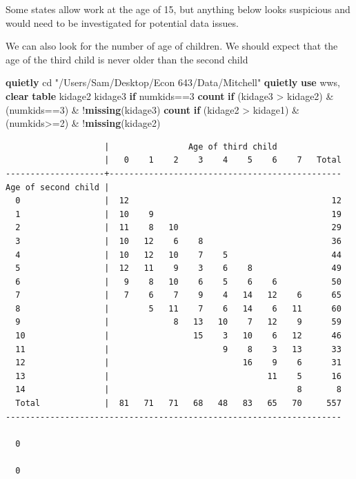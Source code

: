 \documentclass[
]{book}
\newenvironment{Shaded}{\begin{snugshade}}{\end{snugshade}}
\newcommand{\FunctionTok}[1]{\textcolor[rgb]{0.13,0.29,0.53}{\textbf{#1}}}
\newcommand{\KeywordTok}[1]{\textcolor[rgb]{0.13,0.29,0.53}{\textbf{#1}}}
\newcommand{\NormalTok}[1]{#1}
\newcommand{\StringTok}[1]{\textcolor[rgb]{0.31,0.60,0.02}{#1}}
\begin{document}
Some states allow work at the age of 15, but anything below looks suspicious and would need to be investigated for potential data issues.

We can also look for the number of age of children. We should expect that
the age of the third child is never older than the second child

\begin{Shaded}
\begin{Highlighting}[]
\KeywordTok{quietly}\NormalTok{ cd }\StringTok{"/Users/Sam/Desktop/Econ 643/Data/Mitchell"}
\KeywordTok{quietly} \KeywordTok{use}\NormalTok{ wws, }\KeywordTok{clear}
\KeywordTok{table}\NormalTok{ kidage2 kidage3 }\KeywordTok{if}\NormalTok{ numkids==3}
\FunctionTok{count} \KeywordTok{if}\NormalTok{ (kidage3 \textgreater{} kidage2) \& (numkids==3) \& !}\FunctionTok{missing}\NormalTok{(kidage3)}
\FunctionTok{count} \KeywordTok{if}\NormalTok{ (kidage2 \textgreater{} kidage1) \& (numkids\textgreater{}=2) \& !}\FunctionTok{missing}\NormalTok{(kidage2)}
\end{Highlighting}
\end{Shaded}

\begin{verbatim}
                    |                Age of third child             
                    |   0    1    2    3    4    5    6    7   Total
--------------------+-----------------------------------------------
Age of second child |                                               
  0                 |  12                                         12
  1                 |  10    9                                    19
  2                 |  11    8   10                               29
  3                 |  10   12    6    8                          36
  4                 |  10   12   10    7    5                     44
  5                 |  12   11    9    3    6    8                49
  6                 |   9    8   10    6    5    6    6           50
  7                 |   7    6    7    9    4   14   12    6      65
  8                 |        5   11    7    6   14    6   11      60
  9                 |             8   13   10    7   12    9      59
  10                |                 15    3   10    6   12      46
  11                |                       9    8    3   13      33
  12                |                           16    9    6      31
  13                |                                11    5      16
  14                |                                      8       8
  Total             |  81   71   71   68   48   83   65   70     557
--------------------------------------------------------------------

  0

  0
\end{verbatim}
\end{document}
